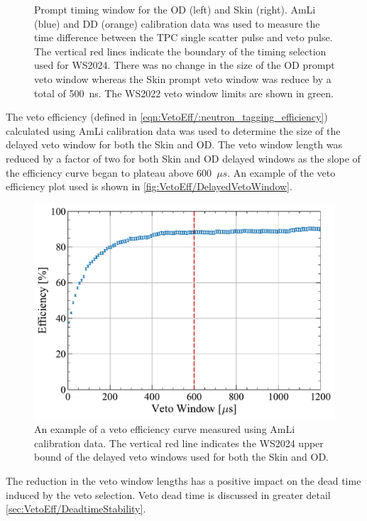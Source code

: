 \begin{figure}[!ht]
\begin{subfigure}[b]{0.48\textwidth}
		\caption{}
        \label{fig:VetoEff/skin_prompt_window}
	\end{subfigure}
	\caption{Prompt timing window for the OD (left) and Skin (right). %
    AmLi (blue) and DD (orange) calibration data was used to measure the time difference between the TPC single scatter pulse and veto pulse. 
    The vertical red lines indicate the boundary of the timing selection used for WS2024. There was no change in the size of the OD prompt veto window whereas the Skin prompt veto window was reduce by a total of 500~ns. The WS2022 veto window limits are shown in green.}
	\label{fig:VetoEff/veto_prompt_windows}
\end{figure}

The veto efficiency (defined in \ref{eqn:VetoEff/:neutron_tagging_efficiency}) calculated using AmLi calibration data was used to determine the size of the delayed veto window for both the Skin and OD. The veto window length was reduced by a factor of two for both Skin and OD delayed windows as the slope of the efficiency curve began to plateau above 600~$\mu s$. An example of the veto efficiency plot used is shown in \autoref{fig:VetoEff/DelayedVetoWindow}.
\begin{figure}[!ht]
    \centering
    \includegraphics[width=0.5\linewidth]{figures/VetoEfficiency/DelayedVetoWindow.pdf}
    \caption{An example of a veto efficiency curve measured using AmLi calibration data. The vertical red line indicates the WS2024 upper bound of the delayed veto windows used for both the Skin and OD.}
    \label{fig:VetoEff/DelayedVetoWindow}
\end{figure}

The reduction in the veto window lengths has a positive impact on the dead time induced by the veto selection. Veto dead time is discussed in greater detail \autoref{sec:VetoEff/DeadtimeStability}.

